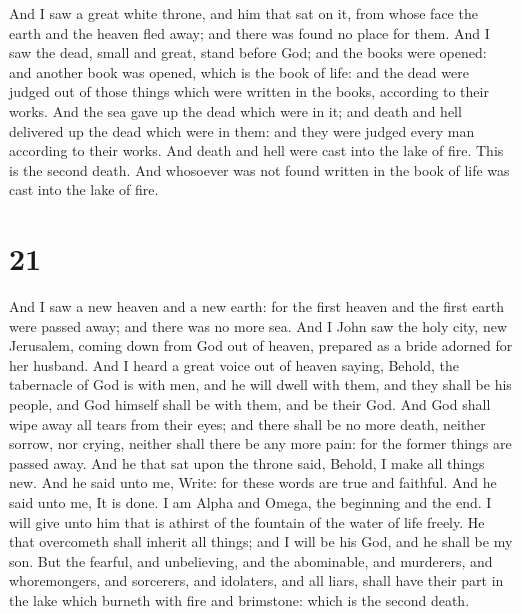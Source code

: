  And I saw a great white throne, and him that sat on it,
from whose face the earth and the heaven fled away; and there was found
no place for them.  And I saw the dead, small and great,
stand before God; and the books were opened: and another book was
opened, which is the book of life: and the dead were judged out of those
things which were written in the books, according to their works.
 And the sea gave up the dead which were in it; and death
and hell delivered up the dead which were in them: and they were judged
every man according to their works.  And death and hell
were cast into the lake of fire. This is the second death. 
And whosoever was not found written in the book of life was cast into
the lake of fire.

\hypertarget{section-20}{%
\section{21}\label{section-20}}

 And I saw a new heaven and a new earth: for the first
heaven and the first earth were passed away; and there was no more sea.
 And I John saw the holy city, new Jerusalem, coming down
from God out of heaven, prepared as a bride adorned for her husband.
 And I heard a great voice out of heaven saying, Behold, the
tabernacle of God is with men, and he will dwell with them, and they
shall be his people, and God himself shall be with them, and be their
God.  And God shall wipe away all tears from their eyes; and
there shall be no more death, neither sorrow, nor crying, neither shall
there be any more pain: for the former things are passed away.
 And he that sat upon the throne said, Behold, I make all
things new. And he said unto me, Write: for these words are true and
faithful.  And he said unto me, It is done. I am Alpha and
Omega, the beginning and the end. I will give unto him that is athirst
of the fountain of the water of life freely.  He that
overcometh shall inherit all things; and I will be his God, and he shall
be my son.  But the fearful, and unbelieving, and the
abominable, and murderers, and whoremongers, and sorcerers, and
idolaters, and all liars, shall have their part in the lake which
burneth with fire and brimstone: which is the second death.

